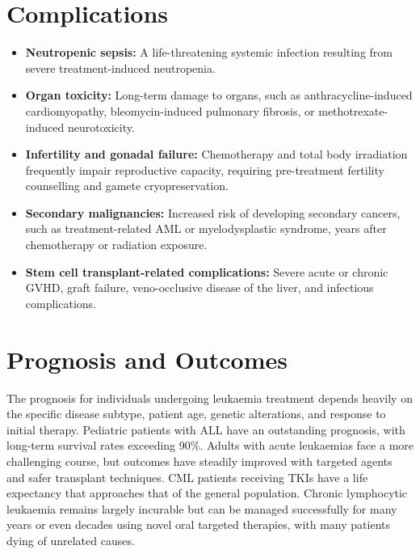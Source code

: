 \section*{Complications}
\begin{itemize}
    \item \textbf{Neutropenic sepsis:} A life-threatening systemic infection resulting from severe treatment-induced neutropenia.
    \item \textbf{Organ toxicity:} Long-term damage to organs, such as anthracycline-induced cardiomyopathy, bleomycin-induced pulmonary fibrosis, or methotrexate-induced neurotoxicity.
    \item \textbf{Infertility and gonadal failure:} Chemotherapy and total body irradiation frequently impair reproductive capacity, requiring pre-treatment fertility counselling and gamete cryopreservation.
    \item \textbf{Secondary malignancies:} Increased risk of developing secondary cancers, such as treatment-related AML or myelodysplastic syndrome, years after chemotherapy or radiation exposure.
    \item \textbf{Stem cell transplant-related complications:} Severe acute or chronic GVHD, graft failure, veno-occlusive disease of the liver, and infectious complications.
\end{itemize}

\section*{Prognosis and Outcomes}
The prognosis for individuals undergoing leukaemia treatment depends heavily on the specific disease subtype, patient age, genetic alterations, and response to initial therapy. Pediatric patients with ALL have an outstanding prognosis, with long-term survival rates exceeding 90\%. Adults with acute leukaemias face a more challenging course, but outcomes have steadily improved with targeted agents and safer transplant techniques. CML patients receiving TKIs have a life expectancy that approaches that of the general population. Chronic lymphocytic leukaemia remains largely incurable but can be managed successfully for many years or even decades using novel oral targeted therapies, with many patients dying of unrelated causes.

